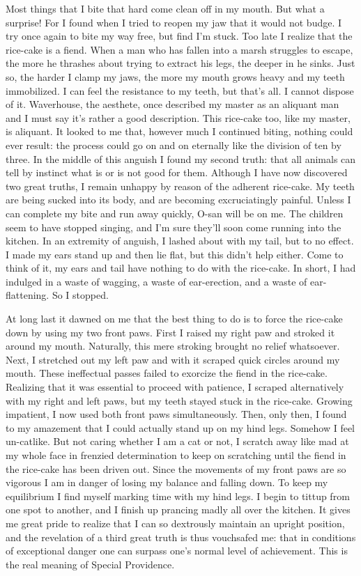 \documentclass[12pt, openright]{book}
\begin{document}
Most things that I bite that hard come clean off in my mouth. But what a
surprise! For I found when I tried to reopen my jaw that it would not
budge. I try once again to bite my way free, but find I'm stuck. Too
late I realize that the rice-cake is a fiend. When a man who has fallen
into a marsh struggles to escape, the more he thrashes about trying to
extract his legs, the deeper in he sinks. Just so, the harder I clamp my
jaws, the more my mouth grows heavy and my teeth immobilized. I can feel
the resistance to my teeth, but that's all. I cannot dispose of it.
Waverhouse, the aesthete, once described my master as an aliquant man
and I must say it's rather a good description. This rice-cake too, like
my master, is aliquant. It looked to me that, however much I continued
biting, nothing could ever result: the process could go on and on
eternally like the division of ten by three. In the middle of this
anguish I found my second truth: that all animals can tell by instinct
what is or is not good for them. Although I have now discovered two
great truths, I remain unhappy by reason of the adherent rice-cake. My
teeth are being sucked into its body, and are becoming excruciatingly
painful. Unless I can complete my bite and run away quickly, O-san will
be on me. The children seem to have stopped singing, and I'm sure
they'll soon come running into the kitchen. In an extremity of anguish,
I lashed about with my tail, but to no effect. I made my ears stand up
and then lie flat, but this didn't help either. Come to think of it, my
ears and tail have nothing to do with the rice-cake. In short, I had
indulged in a waste of wagging, a waste of ear-erection, and a waste of
ear-flattening. So I stopped.

At long last it dawned on me that the best thing to do is to force the
rice-cake down by using my two front paws. First I raised my right paw
and stroked it around my mouth. Naturally, this mere stroking brought no
relief whatsoever. Next, I stretched out my left paw and with it scraped
quick circles around my mouth. These ineffectual passes failed to
exorcize the fiend in the rice-cake. Realizing that it was essential to
proceed with patience, I scraped alternatively with my right and left
paws, but my teeth stayed stuck in the rice-cake. Growing impatient, I
now used both front paws simultaneously. Then, only then, I found to my
amazement that I could actually stand up on my hind legs. Somehow I feel
un-catlike. But not caring whether I am a cat or not, I scratch away
like mad at my whole face in frenzied determination to keep on
scratching until the fiend in the rice-cake has been driven out. Since
the movements of my front paws are so vigorous I am in danger of losing
my balance and falling down. To keep my equilibrium I find myself
marking time with my hind legs. I begin to tittup from one spot to
another, and I finish up prancing madly all over the kitchen. It gives
me great pride to realize that I can so dextrously maintain an upright
position, and the revelation of a third great truth is thus vouchsafed
me: that in conditions of exceptional danger one can surpass one's
normal level of achievement. This is the real meaning of Special
Providence.
\end{document}
